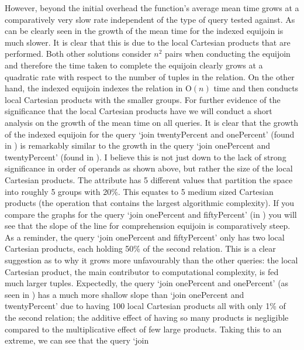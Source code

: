 However, beyond the initial overhead the
function's average mean time grows at a comparatively very slow rate independent
of the type of query tested against. As can be clearly seen in
 the growth of the mean time
for the indexed equijoin is much slower. It is clear that this is due to the
local Cartesian products that are performed. Both other solutions consider $n^2$
pairs when conducting the equijoin and therefore the time taken to complete the
equijoin clearly grows at a quadratic rate with respect to the number of tuples
in the relation. On the other hand, the indexed equijoin indexes the relation in
$\mathrm{O}(n)$ time and then conducts local Cartesian products with the smaller
groups. For further evidence of the significance that the local Cartesian
products have we will conduct a short analysis on the growth of the mean time on
all queries. It is clear that the growth of the indexed equijoin for the query
`join twentyPercent and onePercent' (found in
) is remarkably similar to the growth
in the query `join onePercent and twentyPercent' (found in
). I believe this is not
just down to the lack of strong significance in order of operands as shown
above, but rather the size of the local Cartesian products. The attribute
 has 5 different values that partition the
space into roughly 5 groups with 20\%. This equates to 5 medium sized Cartesian
products (the operation that contains the largest algorithmic complexity). If
you compare the graphs for the query `join onePercent and fiftyPercent' (in
) you will see that the slope
of the line for comprehension equijoin is comparatively steep. As a reminder,
the query `join onePercent and fiftyPercent' only has two local Cartesian
products, each holding 50\% of the second relation. This is a clear suggestion
as to why it grows more unfavourably than the other queries: the local Cartesian
product, the main contributor to computational complexity, is fed much larger
tuples. Expectedly, the query `join onePercent and onePercent' (as seen in
) has a much more shallow slope
than `join onePercent and twentyPercent' due to having 100 local Cartesian
products all with only 1\% of the second relation; the additive effect of
having so many products is negligible compared to the multiplicative effect of
few large products. Taking this to an extreme, we can see that the query `join
